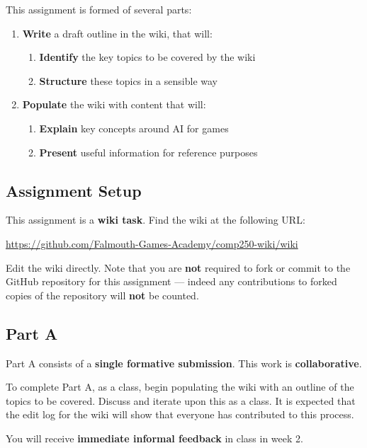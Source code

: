 \documentclass{../../fal_assignment}
\begin{document}
This assignment is formed of several parts:

\begin{enumerate}[label=(\Alph*)]
    \item \textbf{Write} a draft outline in the wiki, that will:
    	\begin{enumerate}[label=(\roman*)]
    		\item \textbf{Identify} the key topics to be covered by the wiki
    		\item \textbf{Structure} these topics in a sensible way
    	\end{enumerate}
    \item \textbf{Populate} the wiki with content that will:
    	\begin{enumerate}[label=(\roman*)]
    		\item \textbf{Explain} key concepts around AI for games
    		\item \textbf{Present} useful information for reference purposes
    	\end{enumerate}
\end{enumerate}

\subsection*{Assignment Setup}

This assignment is a \textbf{wiki task}. Find the wiki at the following URL:

\indent \url{https://github.com/Falmouth-Games-Academy/comp250-wiki/wiki}

Edit the wiki directly. Note that you are \textbf{not} required to fork or commit to the GitHub repository
for this assignment --- indeed any contributions to forked copies of the repository will \textbf{not} be counted.

\subsection*{Part A}

Part A consists of a \textbf{single formative submission}. This work is \textbf{collaborative}.

To complete Part A, as a class, begin populating the wiki with an outline of the topics to be covered.
Discuss and iterate upon this as a class.
It is expected that the edit log for the wiki will show that everyone has contributed to this process.

You will receive \textbf{immediate informal feedback} in class in week 2.
\end{document}
